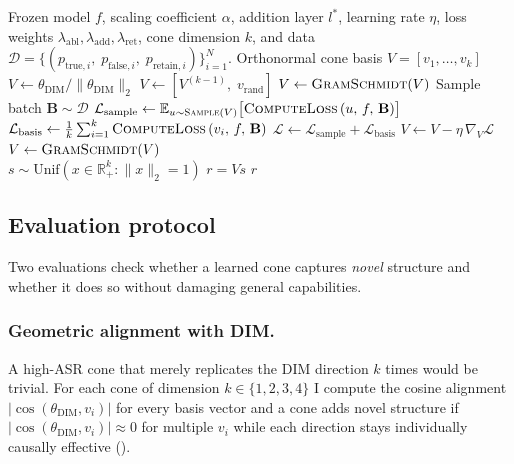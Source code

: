 \documentclass[sn-basic]{sn-jnl}
\newcommand{\dimv}{\theta_{\text{DIM}}}
\begin{document}
\begin{algorithm}[t]
\caption{Truth Cone Optimization (TCO)}
\label{alg:tco}
\begin{algorithmic}[1]
\Require Frozen model $f$, scaling coefficient $\alpha$, addition layer $l^{*}$,
  learning rate $\eta$, loss weights $\lambda_{\text{abl}},
  \lambda_{\text{add}}, \lambda_{\text{ret}}$, cone dimension $k$, and data
  $\mathcal{D} = \{(p_{\text{true},i},\; p_{\text{false},i},\;
  p_{\text{retain},i})\}_{i=1}^{N}$.
\Ensure Orthonormal cone basis $V = [v_1, \ldots, v_k]$
  \State $V \leftarrow \theta_{\text{DIM}} / \|\theta_{\text{DIM}}\|_2$
\Else
  \State $V \leftarrow [V^{(k-1)},\; v_{\text{rand}}]$
  \State $V \leftarrow \textsc{GramSchmidt}(V)$
\EndIf
{}
  \State Sample batch $\mathbf{B} \sim \mathcal{D}$
  \State $\mathcal{L}_{\text{sample}} \leftarrow
    \mathbb{E}_{u \sim \textsc{Sample}(V)}
    \bigl[\textsc{ComputeLoss}\,(u,\, f,\, \mathbf{B})\bigr]$
  \State $\mathcal{L}_{\text{basis}} \leftarrow \frac{1}{k} \sum_{i=1}^{k}
    \textsc{ComputeLoss}\,(v_i,\, f,\, \mathbf{B})$
  \State $\mathcal{L} \leftarrow \mathcal{L}_{\text{sample}} +
    \mathcal{L}_{\text{basis}}$
  \State $V \leftarrow V - \eta\, \nabla_{V} \mathcal{L}$
  \State $V \leftarrow \textsc{GramSchmidt}(V)$
\EndWhile \\
  \State $s \sim \text{Unif}(x \in \mathbb{R}^k_+ : \|x\|_2 = 1)$
  \State $r = V s$
  \State \Return $r$
\EndFunction
\end{algorithmic}
\end{algorithm}


\subsection{Evaluation protocol}
\label{sec:eval}

Two evaluations check whether a learned cone captures \emph{novel} structure and
whether it does so without damaging general capabilities.

\subsubsection*{Geometric alignment with DIM.}
A high-ASR cone that merely replicates the DIM direction $k$ times would be
trivial. For each cone of dimension $k \in \{1, 2, 3, 4\}$ I compute the cosine
alignment $|\cos(\dimv, v_i)|$ for every basis vector and a cone adds novel
structure if $|\cos(\dimv, v_i)| \approx 0$ for multiple $v_i$ while each
direction stays individually causally effective ().
\end{document}
